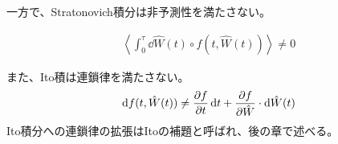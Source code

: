 \documentclass[a4paper,11pt]{jsarticle}
\numberwithin{equation}{section}
\begin{document}
一方で、Stratonovich積分は非予測性を満たさない。

\begin{align}
\left\langle \int_0^\tau \dd{\hat{W}(t)} \circ f(t, \hat{W}(t)) \right\rangle \ne 0
\end{align}

また、Ito積は連鎖律を満たさない。
\begin{align}
\dd{f(t, \hat{W}(t))} \ne \pdv{f}{t} \dd{t} + \pdv{f}{\hat{W}} \cdot \dd{\hat{W}(t)}
\end{align}
Ito積分への連鎖律の拡張はItoの補題と呼ばれ、後の章で述べる。
\end{document}
